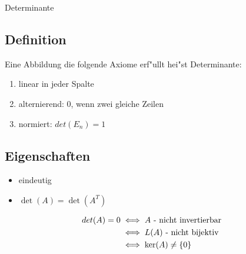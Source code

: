 \documentclass[class=article, crop=false]{standalone}
\begin{document}
\begin{zettel}{Determinante}

\subsection*{Definition}

Eine Abbildung die folgende Axiome erf"ullt hei"st Determinante:
\begin{enumerate}
    \item linear in jeder Spalte
    \item alternierend: 0, wenn zwei gleiche Zeilen
    \item normiert: $det(E_{n}) = 1$
\end{enumerate}

\subsection*{Eigenschaften}
\begin{itemize}
    \item eindeutig
    \item $\det(A) = \det(A^T)$ 
\end{itemize}
\begin{align*}
    det(A) =  0 &\iff A \text{ - nicht invertierbar }\\
                & \iff L(A) \text{ - nicht bijektiv }\\
                & \iff \ker(A) \neq \set{0}\\
\end{align*}

\end{zettel}
\end{document}
